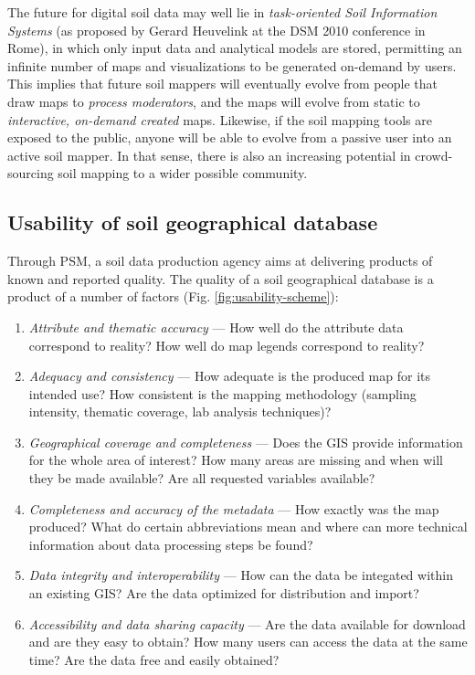 \documentclass[graybox,natbib,nospthms,UStrade]{svmono}
\begin{document}
The future for digital soil data may well lie in \emph{task-oriented Soil
Information Systems} (as proposed by Gerard Heuvelink at the DSM 2010
conference in Rome), in which only input data and analytical models are
stored, permitting an infinite number of maps and visualizations to be
generated on-demand by users. This implies that future soil mappers will
eventually evolve from people that draw maps to \emph{process moderators},
and the maps will evolve from static to \emph{interactive, on-demand created}
maps. Likewise, if the soil mapping tools are exposed to the public,
anyone will be able to evolve from a passive user into an active soil mapper. In
that sense, there is also an increasing potential in crowd-sourcing soil
mapping to a wider possible community.

\hypertarget{usability-of-soil-geographical-database}{%
\subsection{Usability of soil geographical database}\label{usability-of-soil-geographical-database}}

Through PSM, a soil data production agency aims at delivering products of known and reported
quality. The quality of a soil geographical database is a product of a
number of factors (Fig. \ref{fig:usability-scheme}):

\begin{enumerate}
\def\labelenumi{\arabic{enumi}.}
\item
  \emph{Attribute and thematic accuracy} --- How well do the attribute data
  correspond to reality? How well do map legends correspond to
  reality?
\item
  \emph{Adequacy and consistency} --- How adequate is the produced map for
  its intended use? How consistent is the mapping methodology
  (sampling intensity, thematic coverage, lab analysis techniques)?
\item
  \emph{Geographical coverage and completeness} --- Does the GIS provide
  information for the whole area of interest? How many areas are
  missing and when will they be made available? Are all requested
  variables available?
\item
  \emph{Completeness and accuracy of the metadata} --- How exactly was the
  map produced? What do certain abbreviations mean and where can more
  technical information about data processing steps be found?
\item
  \emph{Data integrity and interoperability} --- How can the data be integated
  within an existing GIS? Are the data optimized for distribution and
  import?
\item
  \emph{Accessibility and data sharing capacity} --- Are the data available
  for download and are they easy to obtain? How many users can access
  the data at the same time? Are the data free and easily obtained?
\end{enumerate}
\end{document}
